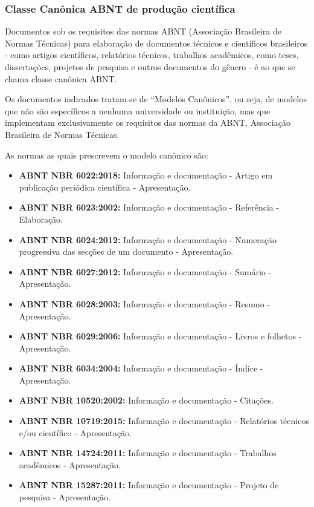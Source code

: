 \documentclass[
12pt,				%
openright,			%
oneside,			%
a4paper,			%
english,			%
french,				%
spanish,			%
brazil,				%
]{abntex2}
\begin{document}
\subsubsection{Classe Canônica ABNT de produção científica}

Documentos sob os requisitos das normas ABNT (Associação Brasileira de Normas
Técnicas) para elaboração de documentos técnicos e científicos
brasileiros - como artigos científicos, relatórios técnicos, trabalhos
acadêmicos, como teses, dissertações, projetos de pesquisa e outros
documentos do gênero \cite{abntex2012} - é ao que se chama classe
canônica ABNT.

\begin{citacao}
  Os documentos indicados tratam-se de “Modelos Canônicos”, ou seja,
  de modelos que não são específicos a nenhuma universidade ou instituição, mas
  que implementam exclusivamente os requisitos das normas da ABNT, Associação
  Brasileira de Normas Técnicas. \cite[Cap. 1]{araujoclasse}
\end{citacao}


As normas as quais prescrevem o modelo canônico são:

\begin{itemize}
\item \textbf{ABNT NBR 6022:2018:} Informação e documentação -
  Artigo em publicação periódica científica - Apresentação.
\item \textbf{ABNT NBR 6023:2002:} Informação e documentação -
  Referência - Elaboração.
\item \textbf{ABNT NBR 6024:2012:} Informação e documentação -
  Numeração progressiva das secções de um documento - Apresentação.
\item \textbf{ABNT NBR 6027:2012:} Informação e documentação -
  Sumário - Apresentação.
\item \textbf{ABNT NBR 6028:2003:} Informação e documentação -
  Resumo - Apresentação.
\item \textbf{ABNT NBR 6029:2006:} Informação e documentação -
  Livros e folhetos - Apresentação.
\item \textbf{ABNT NBR 6034:2004:} Informação e documentação -
  Índice - Apresentação.
\item \textbf{ABNT NBR 10520:2002:} Informação e documentação -
  Citações.
\item \textbf{ABNT NBR 10719:2015:} Informação e documentação -
  Relatórios técnicos e/ou científico - Apresentação.
\item \textbf{ABNT NBR 14724:2011:} Informação e documentação -
  Trabalhos acadêmicos - Apresentação.
\item \textbf{ABNT NBR 15287:2011:} Informação e documentação -
  Projeto de pesquisa - Apresentação.
\end{itemize}
\end{document}
